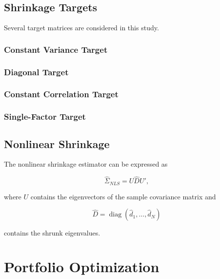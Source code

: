 \documentclass[12pt,a4paper]{article}
\begin{document}
	
	\subsection{Shrinkage Targets}
	
	Several target matrices are considered in this study.
	
	\subsubsection{Constant Variance Target}
	
	\subsubsection{Diagonal Target}
	
	\subsubsection{Constant Correlation Target}
	
	\subsubsection{Single-Factor Target}
	
	
	\subsection{Nonlinear Shrinkage}
	
	The nonlinear shrinkage estimator can be expressed as
	
	\begin{equation}
		\widehat{\Sigma}_{NLS}
		=
		U
		\widehat{D}
		U',
	\end{equation}
	
	where $U$ contains the eigenvectors of the sample covariance
	matrix and
	
	\[
	\widehat{D}
	=
	\operatorname{diag}
	(\widehat d_1,\ldots,\widehat d_N)
	\]
	
	contains the shrunk eigenvalues.
	
	
	
	\section{Portfolio Optimization}
	
\end{document}
